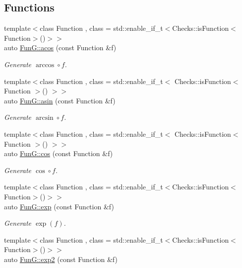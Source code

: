 \subsection*{Functions}
\begin{DoxyCompactItemize}
\item 
{\footnotesize template$<$class Function , class  = std\-::enable\-\_\-if\-\_\-t$<$\-Checks\-::is\-Function$<$\-Function$>$()$>$$>$ }\\auto \hyperlink{group__CMathGroup_gae9b7d3a479bcd8d48cf25f1c29edefb9}{Fun\-G\-::acos} (const Function \&f)
\begin{DoxyCompactList}\small\item\em Generate $ \arccos\circ f $. \end{DoxyCompactList}\item 
{\footnotesize template$<$class Function , class  = std\-::enable\-\_\-if\-\_\-t$<$ Checks\-::is\-Function$<$ Function $>$() $>$$>$ }\\auto \hyperlink{group__CMathGroup_gad26443b289325876cffdaadfca770d51}{Fun\-G\-::asin} (const Function \&f)
\begin{DoxyCompactList}\small\item\em Generate $ \arcsin\circ f $. \end{DoxyCompactList}\item 
{\footnotesize template$<$class Function , class  = std\-::enable\-\_\-if\-\_\-t$<$ Checks\-::is\-Function$<$ Function $>$() $>$$>$ }\\auto \hyperlink{group__CMathGroup_ga7e9b2ac717cd2350663293cb66ba6cbd}{Fun\-G\-::cos} (const Function \&f)
\begin{DoxyCompactList}\small\item\em Generate $ \cos\circ f $. \end{DoxyCompactList}\item 
{\footnotesize template$<$class Function , class  = std\-::enable\-\_\-if\-\_\-t$<$\-Checks\-::is\-Function$<$\-Function$>$()$>$$>$ }\\auto \hyperlink{group__CMathGroup_ga00135c8521411f13813f9b972ea4e231}{Fun\-G\-::exp} (const Function \&f)
\begin{DoxyCompactList}\small\item\em Generate $ \exp(f) $. \end{DoxyCompactList}\item 
{\footnotesize template$<$class Function , class  = std\-::enable\-\_\-if\-\_\-t$<$\-Checks\-::is\-Function$<$\-Function$>$()$>$$>$ }\\auto \hyperlink{group__CMathGroup_ga7724faf7db6e9583ac91df322c26ecf5}{Fun\-G\-::exp2} (const Function \&f)

\end{DoxyCompactItemize}
